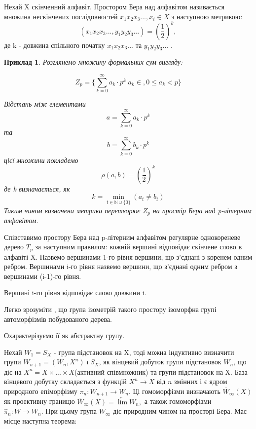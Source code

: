 \documentclass[a4paper,12pt]{article} \usepackage{a4wide}
\numberwithin{equation}{subsection}
\newtheorem{example}{Приклад}[subsection]
\begin{document}
Нехай X скінченний алфавіт. Простором Бера над алфавітом називається множина нескінчених послідовностей
$x_1x_2x_3..., x_i \in X$
з наступною метрикою:
  $$( x_1x_2x_3..., y_1y_2y_3...)=(\frac{1}{2})^k,$$  де k - довжина спільного початку
  $x_1x_2x_3...$ та $y_1y_2y_3...$ .
  \begin{example}
Розглянемо множину формальних сум вигляду:

\[
Z_p  = \{ \sum\limits_{k = 0}^\infty  {a_k  \cdot p^k } \left| {a_k  \in ,} \right.0 \le a_k  < p\}
\]

Відстань між елементами
\[
a = \sum\limits_{k = 0}^\infty  {a_k  \cdot p^k }
\]
та \[
b = \sum\limits_{k = 0}^\infty  {b_k  \cdot p^k }
\] цієї множини покладемо
\[
\rho (a,b) = \left( {\frac{1}{2}} \right)^k
\]
 де k визначається, як
\[
k = \mathop {\min }\limits_{t \in  \mathbb{N}\cup \{ 0\} } (a_t  \ne b_t )
\]
Таким чином визначена метрика перетворює $Z_p$ на простір Бера над p-літерним алфавітом.

\end{example}
  Співставимо простору Бера над p-літерним алфавітом регулярне однокореневе дерево $T_p$ за наступним правилом:
  кожній вершині відповідає скінчене слово в алфавіті X. Назвемо вершинами 1-го рівня вершини, що з'єднані з коренем
  одним ребром. Вершинами i-го рівня назвемо вершини, що з'єднані одним ребром з вершинами (i-1)-го рівня.

   Вершині i-го рівня відповідає слово довжини i.

   Легко зрозуміти , що група ізометрій такого простору ізоморфна групі автоморфізмів
    побудованого дерева.

    Охарактерізуємо її як абстрактну групу.


    Нехай $W_1=S_X$ - група підстановок на X, тоді
 можна індуктивно визначити групи $W_{n+1}=(W_n,X^n)\imath
 S_X$, як вінцевий добуток групи підстановок $W_n$, що діє на
  $X^n=X\times ...\times X$(активний співмножник)
  та групи підстановок на X. База вінцевого добутку
  складається з функцій $X^n\rightarrow X$ від $n$
  змінних і є ядром
  природного епіморфізму $\pi_n:W_{n+1}\rightarrow W_n$. Ці
  гомоморфізми визначають $ \overline{W}_\infty (X)$
  як проективну границю $ \overline{W}_\infty (X) = \underleftarrow {\lim} W_n, $
  а також гомоморфізми $\hat{\pi}_n: \overline{W} \to W_n.$
  При цьому група
  $\overline{W}_\infty$
  діє природним чином на  просторі Бера.
  Має місце наступна теорема:
\end{document}
